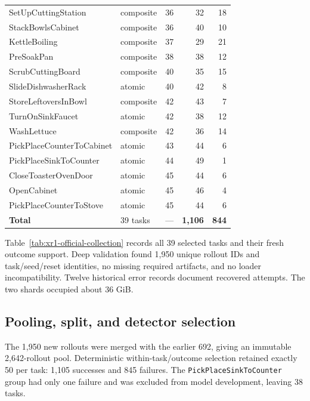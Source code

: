 \documentclass[11pt,a4paper]{article}
\newcommand{\code}[1]{\texttt{#1}}
\begin{document}
\begin{longtable}{p{}p{}rrr}
SetUpCuttingStation & composite & 36 & 32 & 18\\
StackBowlsCabinet & composite & 36 & 40 & 10\\
KettleBoiling & composite & 37 & 29 & 21\\
PreSoakPan & composite & 38 & 38 & 12\\
ScrubCuttingBoard & composite & 40 & 35 & 15\\
SlideDishwasherRack & atomic & 40 & 42 & 8\\
StoreLeftoversInBowl & composite & 42 & 43 & 7\\
TurnOnSinkFaucet & atomic & 42 & 38 & 12\\
WashLettuce & composite & 42 & 36 & 14\\
PickPlaceCounterToCabinet & atomic & 43 & 44 & 6\\
PickPlaceSinkToCounter & atomic & 44 & 49 & 1\\
CloseToasterOvenDoor & atomic & 45 & 44 & 6\\
OpenCabinet & atomic & 45 & 46 & 4\\
PickPlaceCounterToStove & atomic & 45 & 44 & 6\\
\midrule
\textbf{Total} & 39 tasks & --- & \textbf{1,106} & \textbf{844}\\
\bottomrule
\end{longtable}

Table~\ref{tab:xr1-official-collection} records all 39 selected tasks and their
fresh outcome support. Deep validation found 1,950 unique rollout IDs and task/seed/reset identities,
no missing required artifacts, and no loader incompatibility. Twelve historical
error records document recovered attempts. The two shards occupied about
36 GiB.

\subsection{Pooling, split, and detector selection}
The 1,950 new rollouts were merged with the earlier 692, giving an immutable
2,642-rollout pool. Deterministic within-task/outcome selection retained
exactly 50 per task: 1,105 successes and 845 failures. The
\code{PickPlaceSinkToCounter} group had only one failure and was excluded from
model development, leaving 38 tasks.
\end{document}
